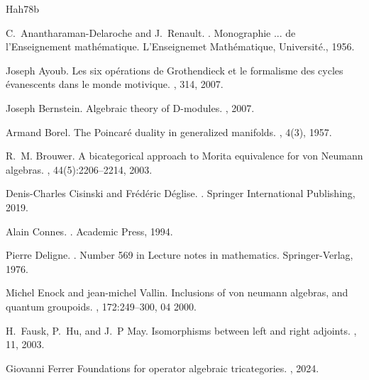 \documentclass[10pt,a4paper,oneside]{amsart}
\theoremstyle{remark}
\theoremstyle{definition}
\begin{document}
%
%

\begin{thebibliography}{Hah78b}
	
	C.~Anantharaman-Delaroche and J.~Renault.
	.
	\newblock Monographie ... de l'Enseignement math{\'e}matique. L'Enseignemet
	Math{\'e}matique, Universit{\'e}., 1956.
	
	Joseph Ayoub.
	\newblock Les six op{\'e}rations de {G}rothendieck et le formalisme des cycles
	\'{e}vanescents dans le monde motivique.
	, 314, 2007.
	
	Joseph Bernstein.
	\newblock Algebraic theory of {D}-modules.
	, 2007.
	
	Armand Borel.
	\newblock The {P}oincaré duality in generalized manifolds.
	, 4(3), 1957.
	
	R.~M. Brouwer.
	\newblock A bicategorical approach to {Morita} equivalence for von {Neumann}
	algebras.
	, 44(5):2206--2214, 2003.
	
	Denis-Charles Cisinski and Frédéric Déglise.
	.
	\newblock Springer International Publishing, 2019.
	
	Alain Connes.
	.
	\newblock Academic Press, 1994.
	
	Pierre Deligne.
	.
	\newblock Number 569 in Lecture notes in mathematics. Springer-Verlag, 1976.
	
	Michel Enock and jean-michel Vallin.
	\newblock Inclusions of von neumann algebras, and quantum groupoids.
	, 172:249--300, 04
	2000.
	
	H.~Fausk, P.~Hu, and J.~P May.
	\newblock Isomorphisms between left and right adjoints.
	, 11, 2003.

	Giovanni Ferrer
	\newblock Foundations for operator algebraic tricategories.
	, 2024.
    

\end{thebibliography}
\end{document}
